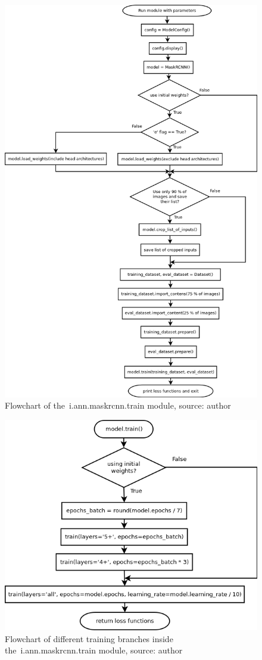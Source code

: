 \begin{figure}[H]
   \centering
	\includegraphics[width=0.95\linewidth]{./pictures/train_dia.png}
	\caption[i.ann.maskrcnn.train flowchart]{Flowchart of the~i.ann.maskrcnn.train module, source: author}
      \label{fig:train}
\end{figure}

\begin{figure}[H]
   \centering
	\includegraphics[width=.7\linewidth]{./pictures/training_dia.png}
	\caption[i.ann.maskrcnn.train training branches flowchart]{Flowchart of different training branches inside the~i.ann.maskrcnn.train module, source: author}
      \label{fig:training}
\end{figure}

